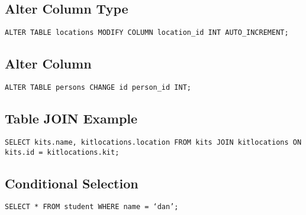 \documentclass{article}
\begin{document}
\begin{multicols}{3}
\subsection{Alter Column Type}
\lstinline|ALTER TABLE locations MODIFY COLUMN location_id INT AUTO_INCREMENT;|

\subsection{Alter Column}
\lstinline|ALTER TABLE persons CHANGE id person_id INT;|

\subsection{Table JOIN Example}
\lstinline|SELECT kits.name, kitlocations.location FROM kits JOIN kitlocations ON kits.id = kitlocations.kit;|

\subsection{Conditional Selection}
\lstinline|SELECT * FROM student WHERE name = ‘dan’;|

\end{multicols}
\end{document}
